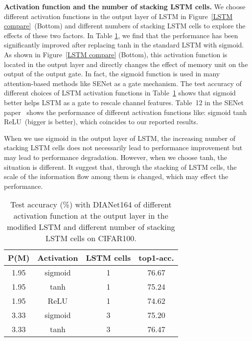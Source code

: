 \documentclass[letterpaper]{article} \usepackage{aaai20}  \usepackage{times}  \usepackage{helvet} \usepackage{courier}  \usepackage[hyphens]{url}  \usepackage{graphicx} \urlstyle{rm} \def\UrlFont{\rm}  \usepackage{graphicx}  \frenchspacing  \setlength{\pdfpagewidth}{8.5in}  \setlength{\pdfpageheight}{11in}  \usepackage{color}
\begin{document}
	\noindent\textbf{Activation function and the number of stacking LSTM cells.} We choose different activation functions in the output layer of LSTM in Figure~\ref{LSTM compare}~(Bottom) and different numbers of stacking LSTM cells to explore the effects of these two factors. 
	In Table \ref{tab:activation and number of unit}, we find that the performance has been significantly improved after replacing tanh in the standard LSTM with sigmoid. As shown in Figure~\ref{LSTM compare} (Bottom), this activation function is located in the output layer and directly changes the effect of memory unit  on the output of the output gate. In fact, the sigmoid function is used in many attention-based methods like SENet as a gate mechanism. The test accuracy of different choices of LSTM activation functions in Table~\ref{tab:activation and number of unit} shows that sigmoid better helps LSTM as a gate to rescale channel features. Table~12 in the SENet paper~\cite{hu2018squeeze} shows the performance of different activation functions like: sigmoid  tanh  ReLU~(bigger is better), which coincides to our reported results.
	
	When we use sigmoid in the output layer of LSTM, the increasing number of stacking LSTM cells does not necessarily lead to performance improvement but may lead to performance degradation. However, when we choose tanh, the situation is different. It suggest that, through the stacking of LSTM cells, the scale of the information flow among them is changed, which may effect the performance.
	
	\begin{table}[htbp]
		\small
		\centering
		\begin{tabular}{|c|c|c|c|}
			\toprule
			P(M) & Activation & LSTM cells& top1-acc. \\
			\midrule
			 1.95  & sigmoid & 1  & 76.67  \\
			 1.95  & tanh  & 1  & 75.24  \\
			 1.95  & ReLU & 1  & 74.62  \\
			 3.33  & sigmoid & 3  & 75.20  \\
			 3.33  & tanh  & 3  & 76.47  \\
			\bottomrule
		\end{tabular}
		\caption{Test accuracy (\%) with DIANet164 of different activation function at the output layer in the modified LSTM and different number of stacking LSTM cells on CIFAR100.}
		\label{tab:activation and number of unit}
	\end{table}	
	
\end{document}

